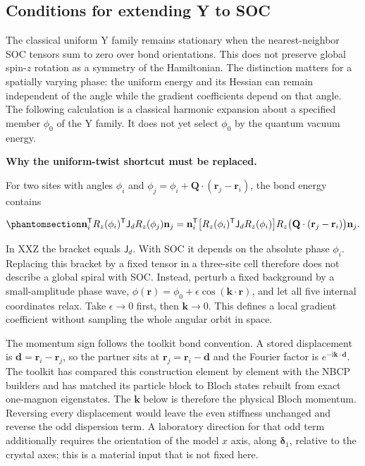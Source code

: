 \subsection{Conditions for extending Y to
SOC}\label{sec-nbcp-y-soc-conditions}

The classical uniform Y family remains stationary when the
nearest-neighbor SOC tensors sum to zero over bond orientations. This
does not preserve global spin-\(z\) rotation as a symmetry of the
Hamiltonian. The distinction matters for a spatially varying phase: the
uniform energy and its Hessian can remain independent of the angle while
the gradient coefficients depend on that angle. The following
calculation is a classical harmonic expansion about a specified member
\(\phi_0\) of the Y family. It does not yet select \(\phi_0\) by the
quantum vacuum energy.

\textbf{Why the uniform-twist shortcut must be replaced.}

For two sites with angles \(\phi_i\) and
\(\phi_j=\phi_i+\mathbf Q\cdot(\mathbf r_j-\mathbf r_i)\), the bond
energy contains

\begin{equation}\phantomsection\label{eq-nbcp-y-soc-twist-obstruction}{
\mathbf n_i^{\mathsf T}R_z(\phi_i)^{\mathsf T}\mathsf J_d R_z(\phi_j)\mathbf n_j
=\mathbf n_i^{\mathsf T}
\bigl[R_z(\phi_i)^{\mathsf T}\mathsf J_d R_z(\phi_i)\bigr]
R_z\bigl(\mathbf Q\cdot(\mathbf r_j-\mathbf r_i)\bigr)\mathbf n_j.
}\end{equation}

In XXZ the bracket equals \(\mathsf J_d\). With SOC it depends on the
absolute phase \(\phi_i\). Replacing this bracket by a fixed tensor in a
three-site cell therefore does not describe a global spiral with SOC.
Instead, perturb a fixed background by a small-amplitude phase wave,
\(\phi(\mathbf r)=\phi_0+\epsilon\cos(\mathbf k\cdot\mathbf r)\), and
let all five internal coordinates relax. Take \(\epsilon\to0\) first,
then \(\mathbf k\to0\). This defines a local gradient coefficient
without sampling the whole angular orbit in space.

The momentum sign follows the toolkit bond convention. A stored
displacement is \(\mathbf d=\mathbf r_i-\mathbf r_j\), so the partner
sits at \(\mathbf r_j=\mathbf r_i-\mathbf d\) and the Fourier factor is
\(e^{-\mathrm i\mathbf k\cdot\mathbf d}\). The toolkit has compared this
construction element by element with the NBCP builders and has matched
its particle block to Bloch states rebuilt from exact one-magnon
eigenstates. The \(\mathbf k\) below is therefore the physical Bloch
momentum. Reversing every displacement would leave the even stiffness
unchanged and reverse the odd dispersion term. A laboratory direction
for that odd term additionally requires the orientation of the model
\(x\) axis, along \(\boldsymbol\delta_1\), relative to the crystal axes;
this is a material input that is not fixed here.

